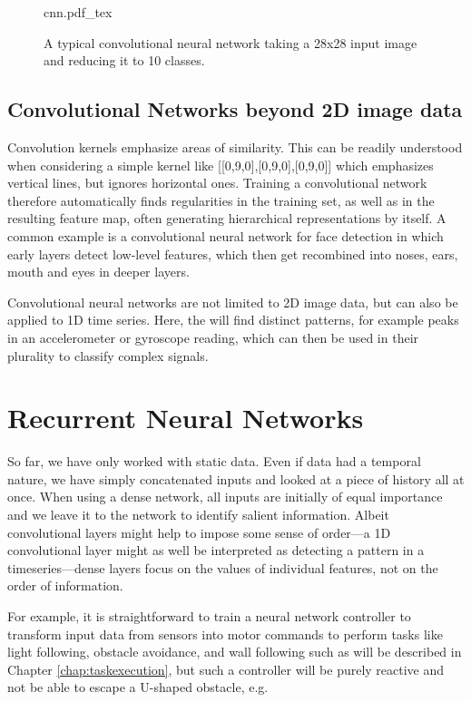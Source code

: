 \begin{figure}[htb]
\tiny
    \centering
    \def\svgwidth{\textwidth}
    {cnn.pdf_tex}
    \caption{A typical convolutional neural network taking a 28x28 input image and reducing it to 10 classes.\label{fig:cnn}}
\end{figure}


\subsection{Convolutional Networks beyond 2D image data}

Convolution kernels emphasize areas of similarity. This can be readily understood when considering a simple kernel like [[0,9,0],[0,9,0],[0,9,0]] which emphasizes vertical lines, but ignores horizontal ones. Training a convolutional network therefore automatically finds regularities in the training set, as well as in the resulting feature map, often generating hierarchical representations by itself. A common example is a convolutional neural network for face detection in which early layers detect low-level features, which then get recombined into noses, ears, mouth and eyes in deeper layers.

Convolutional neural networks are not limited to 2D image data, but can also be applied to 1D time series. Here, the will find distinct patterns, for example peaks in an accelerometer or gyroscope reading, which can then be used in their plurality to classify complex signals. 

\section{Recurrent Neural Networks}
So far, we have only worked with static data. Even if data had a temporal nature, we have simply concatenated inputs and looked at a piece of history all at once. When using a dense network, all inputs are initially of equal importance and we leave it to the network to identify salient information. Albeit convolutional layers might help to impose some sense of order---a 1D convolutional layer might as well be interpreted as detecting a pattern in a timeseries---dense layers focus on the values of individual features, not on the order of information.

For example, it is straightforward to train a neural network controller to transform input data from sensors into motor commands to perform tasks like light following, obstacle avoidance, and wall following such as will be described in Chapter \ref{chap:taskexecution}, but such a controller will be purely reactive and not be able to escape a U-shaped obstacle, e.g.

